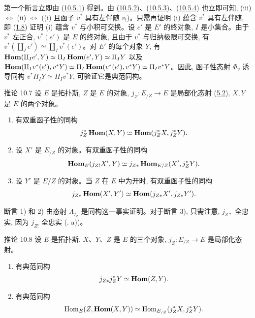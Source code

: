 \setcounter{subsection}{6} \setcounter{subsubsection}{0}
\subsubsection{}
第一个断言立即由 (\hyperref[IV.subsubsec10.5.1]{10.5.1}) 得到。由 (\hyperref[IV.subsubsec10.5.2]{10.5.2})、(\hyperref[IV.subsubsec10.5.3]{10.5.3})、(\hyperref[IV.subsubsec10.5.4]{10.5.4}) 也立即可知, (iii) $\Leftrightarrow$ (ii) $\Leftrightarrow$ ((i) 且函子 $v^{\ast}$ 具有左伴随 $v_{!}$)。只需再证明 (i) 蕴含 $v^{\ast}$ 具有左伴随, 即 (\hyperref[IV.rem1.8]{1.8}) 证明 (i) 蕴含 $v^{\ast}$ 与小积可交换。设 $e'$ 是 $E'$ 的终对象, $I$ 是小集合。由于 $v^{\ast}$ 左正合, $v^{\ast}(e')$ 是 $E$ 的终对象, 且由于 $v^{\ast}$ 与归纳极限可交换, 有 $v^{\ast}(\amalg_I e')\simeq \amalg_I v^{\ast}(e')$。对 $E'$ 的每个对象 $Y$, 有 $\operatorname{\mathbf{Hom}}(\amalg_I e',Y)\simeq \Pi_I\operatorname{\mathbf{Hom}}(e',Y)\simeq \Pi_IY$ 以及 $\operatorname{\mathbf{Hom}}(\amalg_I v^{\ast}(e'),v^{\ast}Y)\simeq
\Pi_I\operatorname{\mathbf{Hom}}(v^{\ast}(e'),v^{\ast}Y)\simeq
\Pi_Iv^{\ast}Y$。\pageoriginale 因此, 函子性态射 $\Phi_v$ 诱导同构 $v^{\ast}\Pi_IY\simeq \Pi_Iv^{\ast}Y$, 可验证它是典范同构。\cqfd

\begin{enonce*}{推论 10.7}
设 $E$ 是拓扑斯, $Z$ 是 $E$ 的对象, $j_Z:E_{/Z}\rightarrow E$ 是局部化态射 (\hyperref[IV.subsec5.2]{5.2}), $X,Y$ 是 $E$ 的两个对象。
\begin{enumerate}
\renewcommand{\labelenumi}{\theenumi)}
\item 有双重函子性的同构
$$
j^{\ast}_Z\operatorname{\mathbf{Hom}}(X,Y)\simeq \operatorname{\mathbf{Hom}}(j^{\ast}_ZX,
j^{\ast}_ZY){}.
$$

\item 设 $X'$ 是 $E_{/Z}$ 的对象。有双重函子性的同构
$$
\operatorname{\mathbf{Hom}}_E(j_{Z!}X',Y)\simeq
j_{Z\ast}\operatorname{\mathbf{Hom}}_{E/Z}(X',j^{\ast}_ZY){}.
$$

\item 设 $Y'$ 是 $E/Z$ 的对象。当 $Z$ 在 $E$ 中为开时, 有双重函子性的同构
$$
j_{Z\ast}\operatorname{\mathbf{Hom}}(X',Y')\simeq \operatorname{\mathbf{Hom}}(j_{Z\ast}X',
j_{Z\ast}Y'){}.
$$
\end{enumerate}
\end{enonce*}

断言 1) 和 2) 由态射 $\Lambda_{j_Z}$ 是同构这一事实证明。对于断言 3), 只需注意, $j_{Z\ast}$ 全忠实, 因为 $j_{Z!}$ 全忠实 (. a))。

\begin{enonce*}{推论 10.8}
设 $E$ 是拓扑斯, $X$、$Y$、$Z$ 是 $E$ 的三个对象, $j_Z:E_{/Z}\rightarrow E$ 是局部化态射。
\begin{enumerate}
\renewcommand{\labelenumi}{\theenumi)}
\item 有典范同构
$$
j_{Z\ast}j^{\ast}_ZY\simeq \operatorname{\mathbf{Hom}}(Z,Y){}.
$$

\item 有典范同构
$$
\operatorname{Hom}_E(Z,\operatorname{\mathbf{Hom}}(X,Y))\simeq
\operatorname{Hom}_{E_{/Z}}(j^{\ast}_ZX,j^{\ast}_ZY){}.
$$
\end{enumerate}
\end{enonce*}

